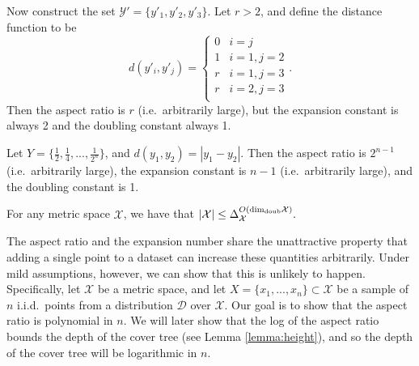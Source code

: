 \documentclass[thesis.tex]{subfiles}
\newcommand{\set}[1]{\mathcal {#1}}
\newcommand{\distribution}[1]{\mathcal {#1}}
\newcommand{\dist}[2]{\distf({#1},{#2})}
\newcommand{\distf}{d}
\newcommand{\aspect}[1]{\Delta_{#1}}
\newcommand{\doubdim}{\text{dim}_\textnormal{doub}}
\begin{document}
\begin{example}
    Now construct the set $\set Y'=\{y'_1, y'_2, y'_3\}$.
    Let $r>2$, and define the distance function to be
    \begin{equation}
        d(y'_i,y'_j) =
        \begin{cases}
            0 & i=j \\
            1 & i=1, j=2 \\
            r & i=1, j=3 \\
            r & i=2, j=3 \\
        \end{cases}
        .
    \end{equation}
    Then the aspect ratio is $r$ (i.e.\ arbitrarily large),
    but the expansion constant is always 2
    and the doubling constant always 1.
\end{example}

\begin{example}
    Let $Y=\{\frac 1 2, \frac 1 4, ..., \frac 1 {2^n}\}$,
    and $\dist{y_1}{y_2}=|y_1-y_2|$.
    Then the aspect ratio is $2^{n-1}$ (i.e.\ arbitrarily large),
    the expansion constant is $n-1$ (i.e.\ arbitrarily large),
    and the doubling constant is 1.
\end{example}

\begin{lemma}
    For any metric space $\set X$, we have that
    $
        |\set X| \le \aspect{\set X}^{O(\doubdim{\set X})}.
    $
\end{lemma}



The aspect ratio and the expansion number share the unattractive property that adding a single point to a dataset can increase these quantities arbitrarily.
Under mild assumptions, however, we can show that this is unlikely to happen.
Specifically, let $\set X$ be a metric space, 
and let $X=\{x_1,...,x_n\}\subset\set X$ be a sample of $n$ i.i.d.\ points from a distribution $\distribution D$ over $\set X$.
Our goal is to show that the aspect ratio is polynomial in $n$.
We will later show that the log of the aspect ratio bounds the depth of the cover tree (see Lemma \ref{lemma:height}),
and so the depth of the cover tree will be logarithmic in $n$.
\end{document}

